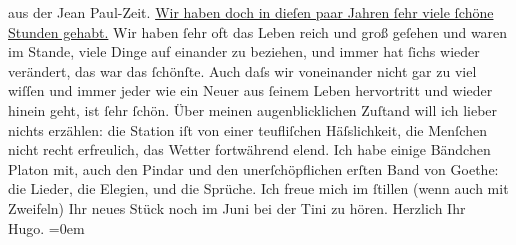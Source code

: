 \begin{ledgroupsized}[t]{13cm}
               aus der Jean Paul-Zeit. \uline{Wir haben doch in dieſen paar Jahren ſehr viele ſchöne Stunden gehabt.}
               Wir haben ſehr oft das Leben reich und groß geſehen und waren im Stande, viele Dinge
               auf einander zu beziehen, und immer hat ſichs wieder verändert, das war das ſchönſte.
                  \label{LL435-1v}Auch daſs wir voneinander nicht gar zu viel
                  wiſſen und immer  jeder {\pb}wie ein Neuer aus ſeinem Leben
                  hervortritt und wieder hinein geht, ist ſehr ſchön.\label{LL435-1h}\pend
           \pstart
           Über meinen augenblicklichen Zuſtand will ich lieber nichts erzählen: die Station iſt
               von einer teufliſchen Häſslichkeit, die Menſchen nicht recht erfreulich, das Wetter
               fortwährend elend. Ich habe einige Bändchen Platon mit, auch den Pindar und den
               unerſchöpflichen erſten Band von Goethe: die
               Lieder, die Elegien, und die Sprüche. Ich freue mich im ſtillen (wenn auch mit
               Zweifeln) Ihr neues Stück noch
               im Juni bei der Tini zu
               hören.\pend
           \pstart
           Herzlich Ihr{\\[\baselineskip]}\spacefill\mbox{Hugo.}\pend
           \leftskip=0em{}
         
         \endnumbering{}\end{ledgroupsized}  \newcommand{\dateiname}{L00545}\newcommand{\titel}{Hugo von Hofmannsthal an Arthur Schnitzler, 17. 5. [1896]}\newcommand{\editorInnen}{ Martin Anton Müller und Gerd-Hermann Susen}
      